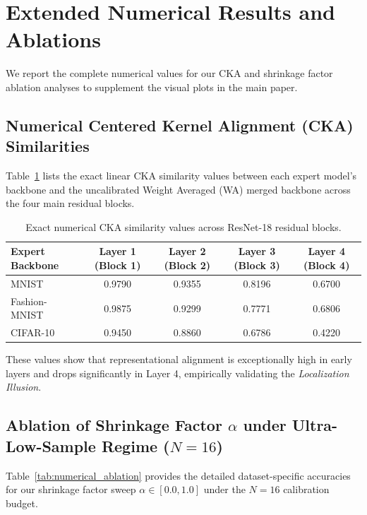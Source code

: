 \documentclass{article}
\theoremstyle{plain}
\theoremstyle{definition}
\theoremstyle{remark}
\begin{document}
\newpage
\section{Extended Numerical Results and Ablations}
\label{app:extended_results}

We report the complete numerical values for our CKA and shrinkage factor ablation analyses to supplement the visual plots in the main paper.

\subsection{Numerical Centered Kernel Alignment (CKA) Similarities}
Table~\ref{tab:numerical_cka} lists the exact linear CKA similarity values between each expert model's backbone and the uncalibrated Weight Averaged (WA) merged backbone across the four main residual blocks.

\begin{table}[ht]
\caption{Exact numerical CKA similarity values across ResNet-18 residual blocks.}
\label{tab:numerical_cka}
\vskip 0.15in
\begin{center}
\begin{small}
\begin{sc}
\begin{tabular}{lcccc}
\toprule
Expert Backbone & Layer 1 (Block 1) & Layer 2 (Block 2) & Layer 3 (Block 3) & Layer 4 (Block 4) \\
\midrule
MNIST & 0.9790 & 0.9355 & 0.8196 & 0.6700 \\
Fashion-MNIST & 0.9875 & 0.9299 & 0.7771 & 0.6806 \\
CIFAR-10 & 0.9450 & 0.8860 & 0.6786 & 0.4220 \\
\bottomrule
\end{tabular}
\end{sc}
\end{small}
\end{center}
\vskip -0.1in
\end{table}
These values show that representational alignment is exceptionally high in early layers and drops significantly in Layer 4, empirically validating the \textit{Localization Illusion}.

\subsection{Ablation of Shrinkage Factor $\alpha$ under Ultra-Low-Sample Regime ($N=16$)}
Table~\ref{tab:numerical_ablation} provides the detailed dataset-specific accuracies for our shrinkage factor sweep $\alpha \in [0.0, 1.0]$ under the $N=16$ calibration budget.
\end{document}
